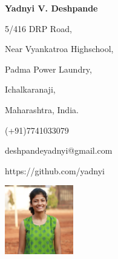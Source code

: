 \documentclass[a4paper,11pt]{article}
\begin{document}
	\begin{flushleft}
	 	\begin{Huge}
			\textbf{Yadnyi V. Deshpande}
		\end{Huge}
	\end{flushleft}

		\begin{minipage}[b]{0.33333\textwidth}
			\raggedright
			5/416 DRP Road,\par
			Near Vyankatroa Highschool,\par
			Padma Power Laundry, \par
			Ichalkaranaji,\par
			Maharashtra, India.
		\end{minipage}%
		\begin{minipage}[b]{0.33333\textwidth}
			\centering
			\begin{large}
				\raggedright
				(+91)7741033079\par
				deshpandeyadnyi@gmail.com\par
				https://github.com/yadnyi\par
			\end{large}
		\end{minipage}%
		\begin{minipage}[b]{0.33333\textwidth}
			\raggedleft
			\includegraphics[width = 30mm, height = 30mm]{yadnyi.JPG}
		\end{minipage}%
	
\end{document}
